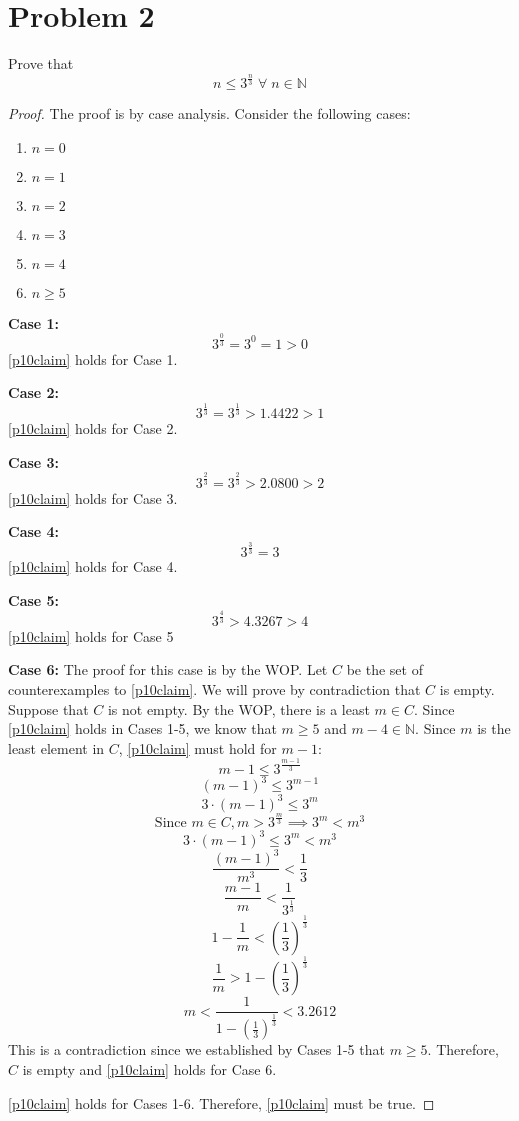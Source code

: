 \documentclass{article}
\begin{document}
\section{Problem 2}
Prove that
\begin{equation}\label{p10claim}
	n \leq 3^{\frac{n}{3}} \; \forall \; n \in \mathbb{N}
\end{equation}
\begin{proof}
	The proof is by case analysis. Consider the following cases:
	\begin{enumerate}
		\item $n = 0$
		\item $n = 1$
		\item $n = 2$
		\item $n = 3$
		\item $n = 4$
		\item $n \geq 5$
	\end{enumerate}

	\textbf{Case 1:}
	\[
		3^{\frac{0}{3}} = 3^0 = 1 > 0
	\]
	\eqref{p10claim} holds for Case 1.

	\textbf{Case 2:}
	\[
		3^{\frac{1}{3}} = 3^{\frac{1}{3}} > 1.4422 > 1
	\]
	\eqref{p10claim} holds for Case 2.

	\textbf{Case 3:}
	\[
		3^{\frac{2}{3}} = 3^{\frac{2}{3}} > 2.0800 > 2
	\]
	\eqref{p10claim} holds for Case 3.

	\textbf{Case 4:}
	\[
		3^{\frac{3}{3}} = 3
	\]
	\eqref{p10claim} holds for Case 4.

	\textbf{Case 5:}
	\[
		3^{\frac{4}{3}} > 4.3267 > 4
	\]
	\eqref{p10claim} holds for Case 5

	\textbf{Case 6:}
	The proof for this case is by the WOP. Let $C$ be the set of counterexamples to \eqref{p10claim}. We will prove by contradiction that $C$ is empty. Suppose that $C$ is not empty. By the WOP, there is a least $m \in C$. Since \eqref{p10claim} holds in Cases 1-5, we know that $m \geq 5$ and $m - 4 \in \mathbb{N}$. Since $m$ is the least element in $C$, \eqref{p10claim} must hold for $m - 1$:
	\[
		m - 1 \leq 3^{\frac{m - 1}{3}}
	\]
	\[
		(m - 1)^3 \leq 3^{m-1}
	\]
	\[
		3 \cdot (m - 1)^3 \leq 3^m
	\]
	\[
		\text{Since } m \in C, m > 3^{\frac{m}{3}} \implies 3^m < m^3
	\]
	\[
		3 \cdot (m - 1)^3 \leq 3^m < m^3
	\]
	\[
		\frac{(m - 1)^3}{m^3} < \frac{1}{3}
	\]
	\[
		\frac{m - 1}{m} < \frac{1}{3^{\frac{1}{3}}}
	\]
	\[
		1 - \frac{1}{m} < \left(\frac{1}{3}\right)^{\frac{1}{3}}
	\]
	\[
		\frac{1}{m} > 1 - \left(\frac{1}{3}\right)^{\frac{1}{3}}
	\]
	\[
		m < \frac{1}{1 - \left(\frac{1}{3}\right)^{\frac{1}{3}}} < 3.2612
	\]
	This is a contradiction since we established by Cases 1-5 that $m \ge 5$. Therefore, $C$ is empty and \eqref{p10claim} holds for Case 6.

	\eqref{p10claim} holds for Cases 1-6. Therefore, \eqref{p10claim} must be true.
\end{proof}
\end{document}
